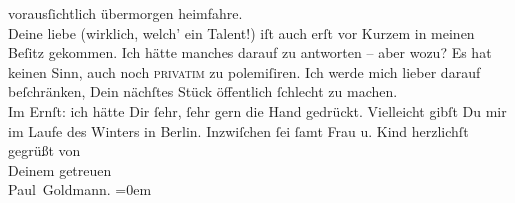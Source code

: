 \begin{ledgroupsized}[t]{13cm}
               vorausſichtlich übermorgen heimfahre.{\\}Deine liebe
                  \label{K-L03251-2v}\label{K-L03251-2h} (wirklich, welch’ ein Talent!) iſt auch erſt vor Kurzem {\pb}in meinen Beſitz gekommen. Ich hätte manches darauf
               zu antworten – aber wozu? Es hat keinen Sinn, auch noch \textsc{privatim} zu polemiſiren. Ich werde mich lieber darauf beſchränken, Dein
               nächſtes Stück öffentlich ſchlecht zu machen. {\\}Im Ernſt: ich hätte Dir ſehr, ſehr
               gern die Hand gedrückt. Vielleicht gibſt Du mir im Laufe des Winters \label{K-L03251-3v}\label{K-L03251-3h} in Berlin. \strikeout{\textcolor{gray}{X}}\pend
           \pstart
           Inzwiſchen ſei ſamt Frau
               u. Kind herzlichſt gegrüßt
               von {\\[\baselineskip]}Deinem getreuen {\\[\baselineskip]}\spacefill\mbox{Paul Goldmann.}\pend
           \leftskip=0em{}
         
         \endnumbering{}\end{ledgroupsized}\begin{anhang}\end{anhang}\newcommand{\dateiname}{L03251}\newcommand{\titel}{Paul Goldmann an Arthur Schnitzler, 18. 9. [1906]}\newcommand{\editorInnen}{Martin Anton Müller und Laura Untner}
      